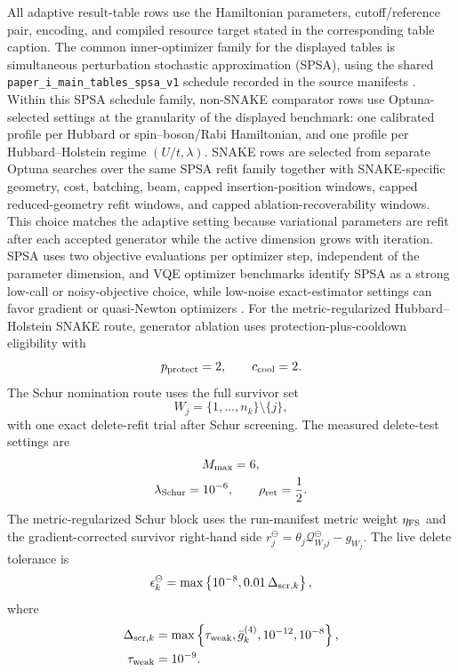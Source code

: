 \documentclass[
  reprint,
  amsmath,
  amssymb,
  aps,
  pra,
  nofootinbib,
  superscriptaddress,
  floatfix
]{revtex4-2}
\begin{document}
All adaptive result-table rows use the Hamiltonian parameters, cutoff/reference pair,
encoding, and compiled resource target stated in the corresponding table
caption. The common inner-optimizer family for the displayed tables is simultaneous
perturbation stochastic approximation (SPSA), using the shared
\texttt{paper\_i\_main\_tables\_spsa\_v1} schedule recorded in the source
manifests \cite{Spall1992SPSA,Kandala2017}. Within this SPSA schedule family,
non-SNAKE comparator rows use Optuna-selected settings at the granularity of the
displayed benchmark: one calibrated profile per Hubbard or spin--boson/Rabi
Hamiltonian, and one profile per Hubbard--Holstein regime \((U/t,\lambda)\).
SNAKE rows are selected from separate Optuna searches over the same SPSA refit
family together with SNAKE-specific geometry, cost, batching, beam,
capped insertion-position windows, capped reduced-geometry refit windows, and
capped ablation-recoverability windows. This choice matches the adaptive
setting because variational parameters are refit after each accepted generator
while the active dimension grows with iteration. SPSA uses two objective
evaluations per optimizer step, independent of the parameter dimension, and VQE
optimizer benchmarks identify SPSA as a strong low-call or noisy-objective
choice, while low-noise exact-estimator settings can favor gradient or
quasi-Newton optimizers
\cite{BonetMonroig2023Optimizer,Singh2023Optimizers,Jones2025FermiHubbardOptimizers}.
For the metric-regularized Hubbard--Holstein SNAKE route, generator ablation
uses protection-plus-cooldown eligibility with
\[
p_{\rm protect}=2,\qquad
c_{\rm cool}=2.
\]
The Schur nomination route uses the full survivor set
\[
W_j=\{1,\ldots,n_k\}\setminus\{j\},
\]
with one exact delete-refit trial after Schur screening.  The measured
delete-test settings are
\[
\begin{gathered}
M_{\max}=6,
\\
\lambda_{\rm Schur}=10^{-6},\qquad
\rho_{\rm ret}=\frac12 .
\end{gathered}
\]
The metric-regularized Schur block uses the run-manifest metric weight
\(\eta_{\rm FS}\) and the gradient-corrected survivor right-hand side
\(r_j^\ominus=\theta_j\mathcal Q^\ominus_{W_jj}-g_{W_j}\).  The live delete
tolerance is
\[
\epsilon_k^\ominus
=
\max\left\{
10^{-8},
0.01\,\Delta_{{\rm scr},k}
\right\},
\]
where
\[
\begin{aligned}
\Delta_{{\rm scr},k}
&=
\max\left\{
\tau_{\rm weak},
\bar g_k^{(4)},
10^{-12},
10^{-8}
\right\},
\\
\tau_{\rm weak}&=10^{-9}.
\end{aligned}
\]
\end{document}
